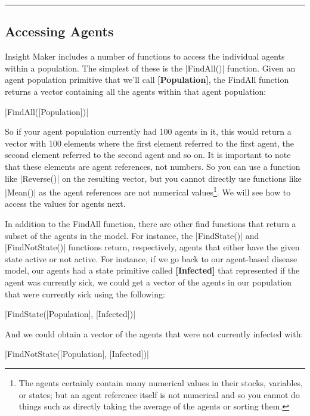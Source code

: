 \documentclass[]{memoir}
\newcommand{\FunctionTok}[1]{\textcolor[rgb]{0.02,0.16,0.49}{{#1}}}
\newcommand{\NormalTok}[1]{{#1}}
\newcommand{\p}[1]{\textbf{{[}#1{]}}}
\begin{document}
\begin{center}\rule{3in}{0.4pt}\end{center}

\subsection{Accessing Agents}

Insight Maker includes a number of functions to access the individual
agents within a population. The simplest of these is the
|\FunctionTok{FindAll}\NormalTok{()}| function. Given an agent
population primitive that we'll call \p{Population}, the FindAll
function returns a vector containing all the agents within that agent
population:

|\FunctionTok{FindAll}\NormalTok{([Population])}|

So if your agent population currently had 100 agents in it, this would
return a vector with 100 elements where the first element referred to
the first agent, the second element referred to the second agent and so
on. It is important to note that these elements are agent references,
not numbers. So you can use a function like
|\FunctionTok{Reverse}\NormalTok{()}| on the resulting vector, but you
cannot directly use functions like |\FunctionTok{Mean}\NormalTok{()}| as
the agent references are not numerical values\footnote{The agents
  certainly contain many numerical values in their stocks, variables, or
  states; but an agent reference itself is not numerical and so you
  cannot do things such as directly taking the average of the agents or
  sorting them.}. We will see how to access the values for agents next.

In addition to the FindAll function, there are other find functions that
return a subset of the agents in the model. For instance, the
|\FunctionTok{FindState}\NormalTok{()}| and
|\FunctionTok{FindNotState}\NormalTok{()}| functions return,
respectively, agents that either have the given state active or not
active. For instance, if we go back to our agent-based disease model,
our agents had a state primitive called \p{Infected} that represented if
the agent was currently sick, we could get a vector of the agents in our
population that were currently sick using the following:

|\FunctionTok{FindState}\NormalTok{([Population], [Infected])}|

And we could obtain a vector of the agents that were not currently
infected with:

|\FunctionTok{FindNotState}\NormalTok{([Population], [Infected])}|
\end{document}
